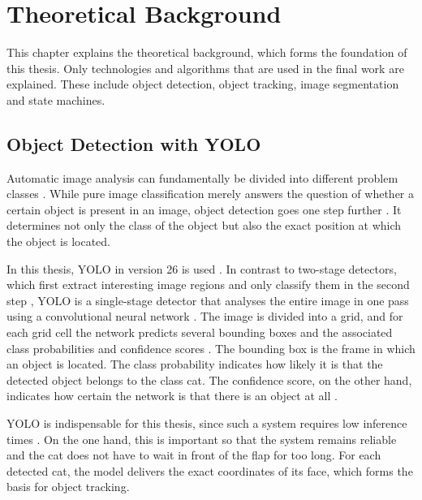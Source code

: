 \chapter{Theoretical Background}
\label{sec:grundlagen}

This chapter explains the theoretical background, which forms the foundation of this thesis. Only technologies and algorithms that are used in the final work are explained. These include object detection, object tracking, image segmentation and state machines.

\section{Object Detection with YOLO}
\label{subsec:yolo_det}

Automatic image analysis can fundamentally be divided into different problem classes \cite{szeliski2022computer}. While pure image classification merely answers the question of whether a certain object is present in an image, object detection goes one step further \cite{zou2023object}. It determines not only the class of the object but also the exact position at which the object is located.

In this thesis, YOLO \cite{jocher2024yolo} in version 26 is used \cite{sapkota2025yolo26}. In contrast to two-stage detectors, which first extract interesting image regions and only classify them in the second step \cite{ren2015faster}, YOLO is a single-stage detector that analyses the entire image in one pass using a convolutional neural network \cite{lecun1998gradient, krizhevsky2012imagenet} \cite{redmon2016yolo}. The image is divided into a grid, and for each grid cell the network predicts several bounding boxes and the associated class probabilities and confidence scores \cite{redmon2016yolo}. The bounding box is the frame in which an object is located. The class probability indicates how likely it is that the detected object belongs to the class cat. The confidence score, on the other hand, indicates how certain the network is that there is an object at all \cite{ultralytics_confidence}.

YOLO is indispensable for this thesis, since such a system requires low inference times \cite{terven2023yolo}. On the one hand, this is important so that the system remains reliable and the cat does not have to wait in front of the flap for too long. For each detected cat, the model delivers the exact coordinates of its face, which forms the basis for object tracking.

